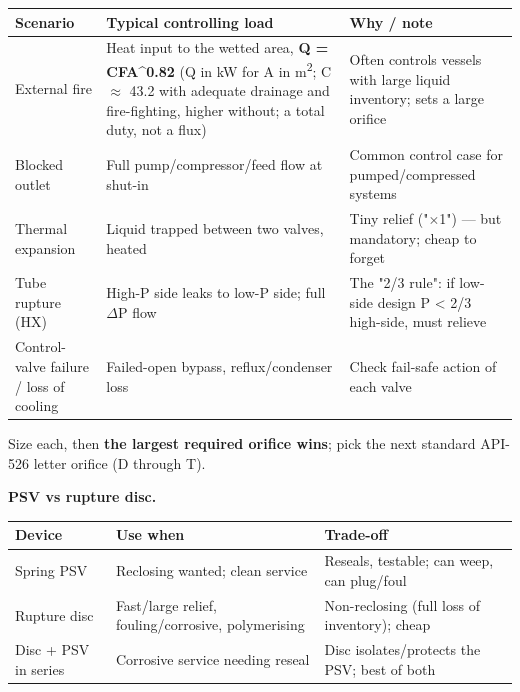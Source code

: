 \documentclass[11pt,a4paper]{article}
\begin{document}
\begin{longtable}[]{@{}>{\raggedright\arraybackslash}p{\dimexpr(\linewidth-6\tabcolsep)/3\relax}>{\raggedright\arraybackslash}p{\dimexpr(\linewidth-6\tabcolsep)/3\relax}>{\raggedright\arraybackslash}p{\dimexpr(\linewidth-6\tabcolsep)/3\relax}@{}}
\toprule\noalign{}
Scenario & Typical controlling load & Why / note \\
\midrule\noalign{}
\endhead
\bottomrule\noalign{}
\endlastfoot
External fire & Heat input to the wetted area, \textbf{Q = C\textperiodcentered{}F\textperiodcentered{}A\^{}0.82} (Q in kW for A in m\textsuperscript{2}; C \(\approx\) 43.2 with adequate drainage and fire-fighting, higher without; a total duty, not a flux) & Often controls vessels with large liquid
inventory; sets a large orifice \\
Blocked outlet & Full pump/compressor/feed flow at shut-in & Common
control case for pumped/compressed systems \\
Thermal expansion & Liquid trapped between two valves, heated & Tiny
relief (\textthreequarters{}"\(\times\)1") --- but mandatory; cheap to forget \\
Tube rupture (HX) & High-P side leaks to low-P side; full \(\Delta\)P flow & The
"2/3 rule": if low-side design P \textless{} 2/3 high-side, must
relieve \\
Control-valve failure / loss of cooling & Failed-open bypass,
reflux/condenser loss & Check fail-safe action of each valve \\
\end{longtable}

Size each, then \textbf{the largest required orifice wins}; pick the
next standard API-526 letter orifice (D through T).

\textbf{PSV vs rupture disc.}

\begin{longtable}[]{@{}>{\raggedright\arraybackslash}p{\dimexpr(\linewidth-6\tabcolsep)/3\relax}>{\raggedright\arraybackslash}p{\dimexpr(\linewidth-6\tabcolsep)/3\relax}>{\raggedright\arraybackslash}p{\dimexpr(\linewidth-6\tabcolsep)/3\relax}@{}}
\toprule\noalign{}
Device & Use when & Trade-off \\
\midrule\noalign{}
\endhead
\bottomrule\noalign{}
\endlastfoot
Spring PSV & Reclosing wanted; clean service & Reseals, testable; can
weep, can plug/foul \\
Rupture disc & Fast/large relief, fouling/corrosive, polymerising &
Non-reclosing (full loss of inventory); cheap \\
Disc + PSV in series & Corrosive service needing reseal & Disc
isolates/protects the PSV; best of both \\
\end{longtable}
\end{document}
